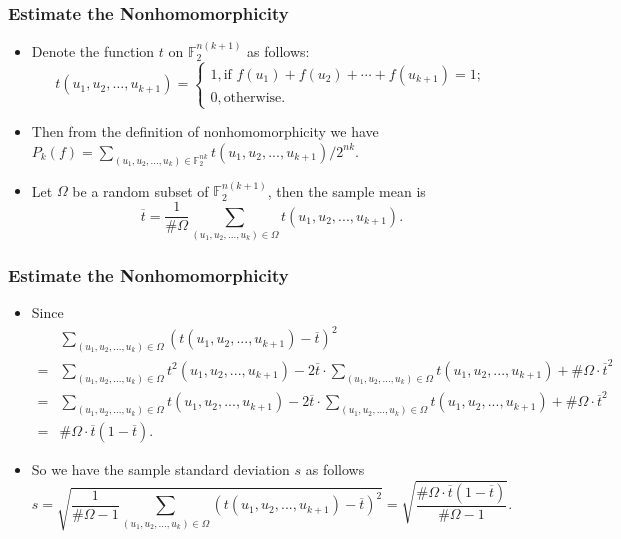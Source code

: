 \documentclass[
    aspectratio=169,                   %
]{beamer}
\newcommand{\F}{\mathbb{F}}
\begin{document}
    \begin{frame}
        \frametitle{Estimate the Nonhomomorphicity}
    
        \begin{itemize}
            \item Denote the function $t$ on $\F_2^{n(k+1)}$ as follows:
            \begin{equation*}
                t(u_1,u_2,\dots,u_{k+1})=\begin{cases}
                    1,\text{if }f(u_1)+f(u_2)+\cdots+f(u_{k+1})=1;\\
                    0,\text{otherwise}.
                \end{cases}
            \end{equation*}
            \item Then from the definition of nonhomomorphicity we have $P_k(f)=\sum_{(u_1,u_2,...,u_k)\in\F_2^{nk}}^{}t(u_1,u_2,...,u_{k+1})/2^{nk}$.
            \item Let $\Omega$ be a random subset of $\F_2^{n(k+1)}$, then the sample mean is 
            \[\overline{t}=\frac{1}{\#\Omega}\sum_{(u_1,u_2,...,u_k)\in\Omega}^{}t(u_1,u_2,...,u_{k+1}).\]
        \end{itemize}
    
    \end{frame}

    \begin{frame}
        \frametitle{Estimate the Nonhomomorphicity}
    
        \begin{itemize}
            \item Since  
            \begin{align*}
                &\sum_{(u_1,u_2,...,u_k)\in\Omega}^{}(t(u_1,u_2,...,u_{k+1})-\overline{t})^2\\
                =&\sum_{(u_1,u_2,...,u_k)\in\Omega}^{}t^2(u_1,u_2,...,u_{k+1})-2\overline{t}\cdot\sum_{(u_1,u_2,...,u_k)\in\Omega}^{}t(u_1,u_2,...,u_{k+1})+\#\Omega\cdot\overline{t}^2\\
                =&\sum_{(u_1,u_2,...,u_k)\in\Omega}^{}t(u_1,u_2,...,u_{k+1})-2\overline{t}\cdot\sum_{(u_1,u_2,...,u_k)\in\Omega}^{}t(u_1,u_2,...,u_{k+1})+\#\Omega\cdot\overline{t}^2\\
                =&\#\Omega\cdot\overline{t}(1-\overline{t}).
            \end{align*}
            \item So we have the sample standard deviation $s$ as follows 
            \[s=\sqrt{\frac{1}{\#\Omega-1}\sum_{(u_1,u_2,...,u_k)\in\Omega}^{}(t(u_1,u_2,...,u_{k+1})-\overline{t})^2}=\sqrt{\frac{\#\Omega\cdot\overline{t}(1-\overline{t})}{\#\Omega-1}}.\]
        \end{itemize}
    
    \end{frame}
\end{document}

